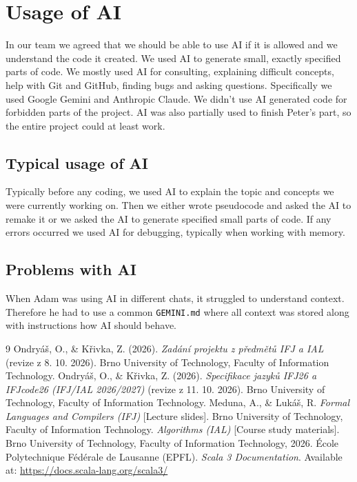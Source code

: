 \documentclass[a4paper]{article}
\begin{document}
\newpage
\section{Usage of AI}

In our team we agreed that we should be able to use AI if it is allowed and we understand the code it created.
We used AI to generate small, exactly specified parts of code.
We mostly used AI for consulting, explaining difficult concepts, help with Git and GitHub, finding bugs and asking questions.
Specifically we used Google Gemini and Anthropic Claude.
We didn't use AI generated code for forbidden parts of the project.
AI was also partially used to finish Peter's part, so the entire project could at least work.

\subsection{Typical usage of AI}

Typically before any coding, we used AI to explain the topic and concepts we were currently working on.
Then we either wrote pseudocode and asked the AI to remake it or we asked the AI to generate specified small parts of code.
If any errors occurred we used AI for debugging, typically when working with memory.

\subsection{Problems with AI}

When Adam was using AI in different chats, it struggled to understand context. Therefore he had to use a common \texttt{GEMINI.md} where all context was stored along with instructions how AI should behave.

\begin{thebibliography}{9}
  Ondryáš, O., \& Křivka, Z. (2026).
  \textit{Zadání projektu z předmětů IFJ a IAL} (revize z 8. 10. 2026).
  Brno University of Technology, Faculty of Information Technology.
  Ondryáš, O., \& Křivka, Z. (2026).
  \textit{Specifikace jazyků IFJ26 a IFJcode26 (IFJ/IAL 2026/2027)} (revize z 11. 10. 2026).
  Brno University of Technology, Faculty of Information Technology.
  Meduna, A., \& Lukáš, R.
  \textit{Formal Languages and Compilers (IFJ)} [Lecture slides].
  Brno University of Technology, Faculty of Information Technology.
  \textit{Algorithms (IAL)} [Course study materials].
  Brno University of Technology, Faculty of Information Technology, 2026.
  École Polytechnique Fédérale de Lausanne (EPFL).
  \textit{Scala 3 Documentation}.
  Available at: \url{https://docs.scala-lang.org/scala3/}
\end{thebibliography}
\end{document}
